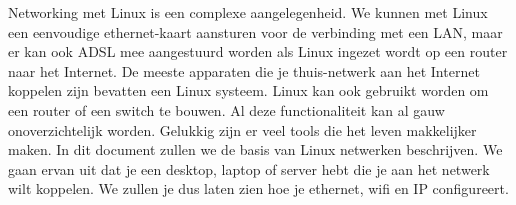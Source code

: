 Networking met Linux is een complexe aangelegenheid. We kunnen met Linux een eenvoudige ethernet-kaart aansturen voor de verbinding met een LAN, maar er kan ook ADSL mee aangestuurd worden als Linux ingezet wordt op een router naar het Internet. De meeste apparaten die je thuis-netwerk aan het Internet koppelen zijn bevatten een Linux systeem. Linux kan ook gebruikt worden om een router of een switch te bouwen. Al deze functionaliteit kan al gauw onoverzichtelijk worden. Gelukkig zijn er veel tools die het leven makkelijker maken. In dit document zullen we de basis van Linux netwerken beschrijven. We gaan ervan uit dat je een desktop, laptop of server hebt die je aan het netwerk wilt koppelen. We zullen je dus laten zien hoe je ethernet, wifi en IP configureert.

